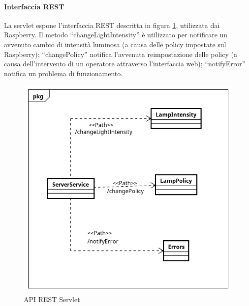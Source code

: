 \paragraph{Interfaccia REST}
La servlet espone l'interfaccia REST descritta in figura \ref{API REST SERVLET}, utilizzata dai Raspberry.
Il metodo ``changeLightIntensity'' è utilizzato per notificare un avvenuto cambio di intensità luminosa (a causa delle policy impostate sul Raspberry); ``changePolicy'' notifica l'avvenuta reimpostazione delle policy (a causa dell'intervento di un operatore attraverso l'interfaccia web); ``notifyError'' notifica un problema di funzionamento.
\begin{figure}[tbp]
	\centering
	\includegraphics[scale=.8]{figure/Class_Diagram_Server_REST.png}
	\caption{API REST Servlet \label{API REST SERVLET}}
\end{figure}
